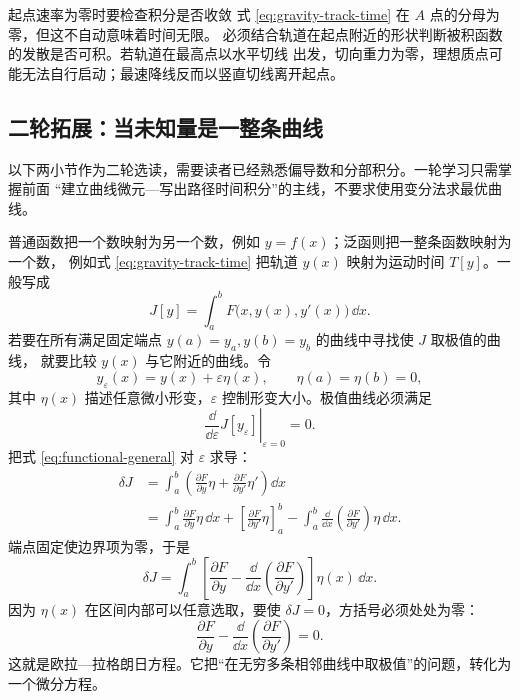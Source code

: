 \documentclass[UTF8,zihao=-4,oneside,openany]{ctexbook}
\begin{document}
\begin{warningbox}{起点速率为零时要检查积分是否收敛}
式 \eqref{eq:gravity-track-time} 在 $A$ 点的分母为零，但这不自动意味着时间无限。
必须结合轨道在起点附近的形状判断被积函数的发散是否可积。若轨道在最高点以水平切线
出发，切向重力为零，理想质点可能无法自行启动；最速降线反而以竖直切线离开起点。
\end{warningbox}

\subsection{二轮拓展：当未知量是一整条曲线}

{\small\color{TextGray}\noindent
以下两小节作为二轮选读，需要读者已经熟悉偏导数和分部积分。一轮学习只需掌握前面
“建立曲线微元—写出路径时间积分”的主线，不要求使用变分法求最优曲线。\par}

普通函数把一个数映射为另一个数，例如 $y=f(x)$；泛函则把一整条函数映射为一个数，
例如式 \eqref{eq:gravity-track-time} 把轨道 $y(x)$ 映射为运动时间 $T[y]$。一般写成
\begin{equation}
  J[y]=\int_a^b F\bigl(x,y(x),y'(x)\bigr)\,\dd x.
  \label{eq:functional-general}
\end{equation}
若要在所有满足固定端点 $y(a)=y_a,y(b)=y_b$ 的曲线中寻找使 $J$ 取极值的曲线，
就要比较 $y(x)$ 与它附近的曲线。令
\begin{equation}
  y_\varepsilon(x)=y(x)+\varepsilon\eta(x),
  \qquad
  \eta(a)=\eta(b)=0,
  \label{eq:varied-curve}
\end{equation}
其中 $\eta(x)$ 描述任意微小形变，$\varepsilon$ 控制形变大小。极值曲线必须满足
\[
  \left.\frac{\dd}{\dd\varepsilon}J[y_\varepsilon]\right|_{\varepsilon=0}=0.
\]
把式 \eqref{eq:functional-general} 对 $\varepsilon$ 求导：
\begin{align*}
  \delta J
  &=\int_a^b\left(
    \frac{\partial F}{\partial y}\eta
    +\frac{\partial F}{\partial y'}\eta'
  \right)\dd x\\
  &=\int_a^b\frac{\partial F}{\partial y}\eta\,\dd x
  +\left[\frac{\partial F}{\partial y'}\eta\right]_a^b
  -\int_a^b\frac{\dd}{\dd x}
    \left(\frac{\partial F}{\partial y'}\right)\eta\,\dd x.
\end{align*}
端点固定使边界项为零，于是
\begin{equation}
  \delta J=\int_a^b\left[
  \frac{\partial F}{\partial y}
  -\frac{\dd}{\dd x}\left(\frac{\partial F}{\partial y'}\right)
  \right]\eta(x)\,\dd x.
  \label{eq:first-variation}
\end{equation}
因为 $\eta(x)$ 在区间内部可以任意选取，要使 $\delta J=0$，方括号必须处处为零：
\begin{equation}
  \boxed{
  \frac{\partial F}{\partial y}
  -\frac{\dd}{\dd x}\left(\frac{\partial F}{\partial y'}\right)=0
  }.
  \label{eq:euler-lagrange}
\end{equation}
这就是欧拉—拉格朗日方程。它把“在无穷多条相邻曲线中取极值”的问题，转化为一个微分方程。
\end{document}
